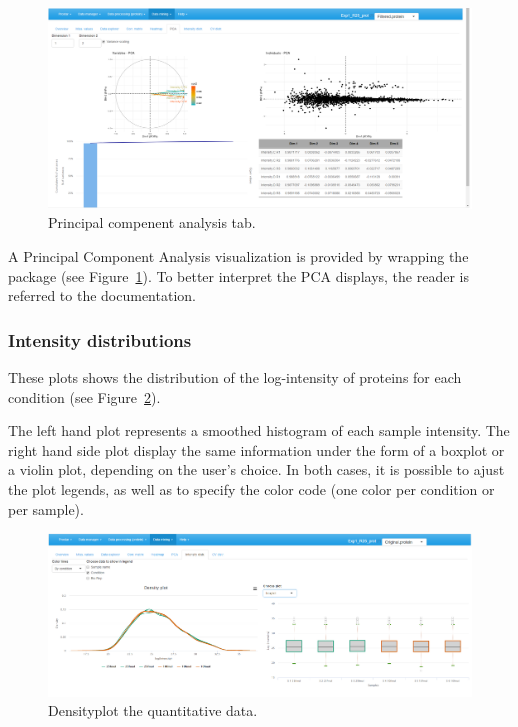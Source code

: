\documentclass[12pt]{article}
\begin{document}
\begin {figure}
\includegraphics[width=\textwidth]{images/desc_PCA.png}
\caption{Principal compenent analysis tab.}\label{fig:pca}
\end {figure}

A Principal Component Analysis visualization is provided by wrapping the  package (see Figure~\ref{fig:pca}). To better interpret the PCA displays, the reader is referred to the  documentation. 


\subsubsection {Intensity distributions}\label{sec:densityplot}
These plots shows the distribution of the log-intensity of proteins for each 
condition (see Figure~\ref{fig:sddp}).

The left hand plot represents a smoothed histogram of each sample intensity. The right hand side plot display the same information under the form of a boxplot or a violin plot, depending on the user's choice. In both cases, it is possible to ajust the plot legends, as well as to specify the color code (one color per condition or per sample).

\begin {figure}
\includegraphics[width=\textwidth]{images/desc_intdistrib.png}
\caption{Densityplot the quantitative data.}\label{fig:sddp}
\end {figure}
\end{document}
